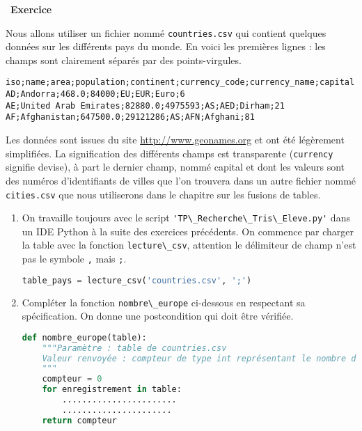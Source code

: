 \documentclass[
  11pt,
]{article}
\newcommand{\passthrough}[1]{#1}
\newcounter{exo}
\newenvironment{exercice}[1]
{\par \medskip   \addtocounter{exo}{1} \noindent  
\begin{bclogo}[arrondi =0.1,   noborder = true, logo=\bccrayon, marge=4]{~\textbf{Exercice} \textbf{\theexo} {\itshape #1} }  \par}
{
\end{bclogo}
 \par \bigskip }
\newcounter{def}
\begin{document}
\begin{exercice}{}

Nous allons utiliser un fichier nommé
\passthrough{\lstinline!countries.csv!} qui contient quelques données
sur les différents pays du monde. En voici les premières lignes : les
champs sont clairement séparés par des points-virgules.

\begin{lstlisting}
iso;name;area;population;continent;currency_code;currency_name;capital
AD;Andorra;468.0;84000;EU;EUR;Euro;6
AE;United Arab Emirates;82880.0;4975593;AS;AED;Dirham;21
AF;Afghanistan;647500.0;29121286;AS;AFN;Afghani;81
\end{lstlisting}

Les données sont issues du site \url{http://www.geonames.org} et ont été
légèrement simplifiées. La signification des différents champs est
transparente (\passthrough{\lstinline!currency!} signifie devise), à
part le dernier champ, nommé capital et dont les valeurs sont des
numéros d'identifiants de villes que l'on trouvera dans un autre fichier
nommé \passthrough{\lstinline!cities.csv!} que nous utiliserons dans le
chapitre sur les fusions de tables.

\begin{enumerate}
\def\labelenumi{\arabic{enumi}.}
\item
  On travaille toujours avec le script
  \passthrough{\lstinline!'TP\_Recherche\_Tris\_Eleve.py'!} dans un IDE
  Python à la suite des exercices précédents. On commence par charger la
  table avec la fonction \passthrough{\lstinline!lecture\_csv!},
  attention le délimiteur de champ n'est pas le symbole
  \passthrough{\lstinline!,!} mais \passthrough{\lstinline!;!}.

\begin{lstlisting}[language=Python]
table_pays = lecture_csv('countries.csv', ';')
\end{lstlisting}
\item
  Compléter la fonction \passthrough{\lstinline!nombre\_europe!}
  ci-dessous en respectant sa spécification. On donne une postcondition
  qui doit être vérifiée.

\begin{lstlisting}[language=Python]
def nombre_europe(table):
    """Paramètre : table de countries.csv
    Valeur renvoyée : compteur de type int représentant le nombre de pays du continent européen
    """
    compteur = 0
    for enregistrement in table:
        .......................
        ......................
    return compteur


\end{lstlisting}
\end{enumerate}
\end{exercice}
\end{document}
